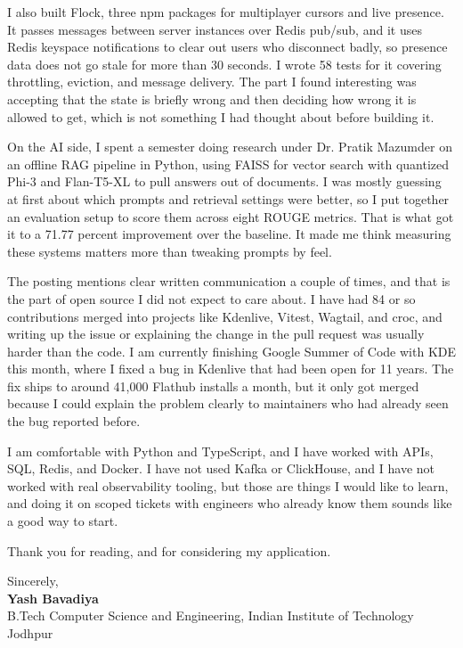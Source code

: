 \documentclass[letterpaper,10pt]{article}
\begin{document}
I also built Flock, three npm packages for multiplayer cursors and live presence. It passes messages between server instances over Redis pub/sub, and it uses Redis keyspace notifications to clear out users who disconnect badly, so presence data does not go stale for more than 30 seconds. I wrote 58 tests for it covering throttling, eviction, and message delivery. The part I found interesting was accepting that the state is briefly wrong and then deciding how wrong it is allowed to get, which is not something I had thought about before building it.

On the AI side, I spent a semester doing research under Dr. Pratik Mazumder on an offline RAG pipeline in Python, using FAISS for vector search with quantized Phi-3 and Flan-T5-XL to pull answers out of documents. I was mostly guessing at first about which prompts and retrieval settings were better, so I put together an evaluation setup to score them across eight ROUGE metrics. That is what got it to a 71.77 percent improvement over the baseline. It made me think measuring these systems matters more than tweaking prompts by feel.

The posting mentions clear written communication a couple of times, and that is the part of open source I did not expect to care about. I have had 84 or so contributions merged into projects like Kdenlive, Vitest, Wagtail, and croc, and writing up the issue or explaining the change in the pull request was usually harder than the code. I am currently finishing Google Summer of Code with KDE this month, where I fixed a bug in Kdenlive that had been open for 11 years. The fix ships to around 41,000 Flathub installs a month, but it only got merged because I could explain the problem clearly to maintainers who had already seen the bug reported before.

I am comfortable with Python and TypeScript, and I have worked with APIs, SQL, Redis, and Docker. I have not used Kafka or ClickHouse, and I have not worked with real observability tooling, but those are things I would like to learn, and doing it on scoped tickets with engineers who already know them sounds like a good way to start.

Thank you for reading, and for considering my application.

\vspace{6pt}

Sincerely, \\
\textbf{Yash Bavadiya} \\
B.Tech Computer Science and Engineering, Indian Institute of Technology Jodhpur
\end{document}
